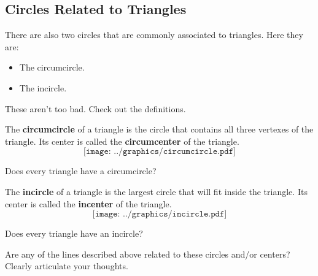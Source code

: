 \subsection{Circles Related to Triangles}


There are also two circles that are commonly associated to
triangles. Here they are:
\begin{itemize}
\item The circumcircle.
\item The incircle.
\end{itemize}

These aren't too bad. Check out the definitions.

\begin{definition}
The \textbf{circumcircle} of a triangle is the circle that contains
all three vertexes of the triangle. Its center is called the
\textbf{circumcenter} of the triangle.
\[
\texttt{[image: ../graphics/circumcircle.pdf]}
\]
\end{definition}

\begin{question} Does every triangle have a circumcircle?
\end{question}
\QM

\begin{definition}
The \textbf{incircle} of a triangle is the largest circle that will
fit inside the triangle. Its center is called the \textbf{incenter} of
the triangle.
\[
\texttt{[image: ../graphics/incircle.pdf]}
\]
\end{definition}


\begin{question} Does every triangle have an incircle?
\end{question}
\QM


\begin{question} 
Are any of the lines described above related to these circles and/or
centers? Clearly articulate your thoughts.
\end{question}
\QM


